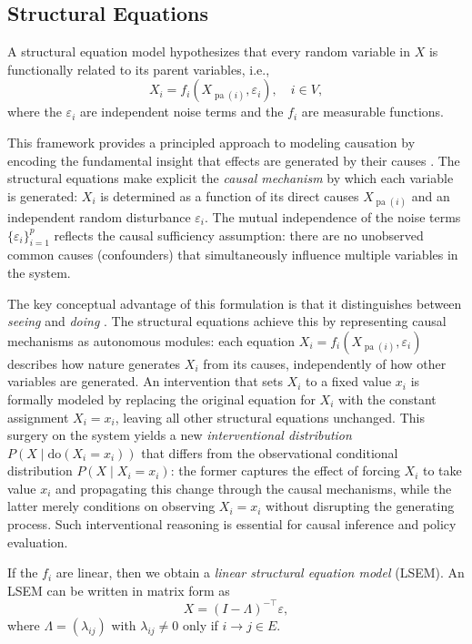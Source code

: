 \documentclass[11pt,a4paper]{article}
\numberwithin{equation}{section}
\DeclareMathOperator{\pa}{pa}
\begin{document}

\subsection{Structural Equations}
\label{subsec:equations}

A structural equation model hypothesizes that every random variable in $X$ is functionally related to its parent variables, i.e.,
\[
X_i = f_i(X_{\pa(i)}, \varepsilon_i), \quad i \in V,
\]
where the $\varepsilon_i$ are independent noise terms and the $f_i$ are measurable functions.

This framework provides a principled approach to modeling causation by encoding the fundamental insight that effects are generated by their causes \citep{Peters:Elements:2017}. The structural equations make explicit the \emph{causal mechanism} by which each variable is generated: $X_i$ is determined as a function of its direct causes $X_{\pa(i)}$ and an independent random disturbance $\varepsilon_i$. The mutual independence of the noise terms $\{\varepsilon_i\}_{i=1}^p$ reflects the causal sufficiency assumption: there are no unobserved common causes (confounders) that simultaneously influence multiple variables in the system.

The key conceptual advantage of this formulation is that it distinguishes between \emph{seeing} and \emph{doing} \citep{pearl:causality:2009}. The structural equations achieve this by representing causal mechanisms as autonomous modules: each equation $X_i = f_i(X_{\pa(i)}, \varepsilon_i)$ describes how nature generates $X_i$ from its causes, independently of how other variables are generated. An intervention that sets $X_i$ to a fixed value $x_i$ is formally modeled by replacing the original equation for $X_i$ with the constant assignment $X_i = x_i$, leaving all other structural equations unchanged. This surgery on the system yields a new \emph{interventional distribution} $P(X \mid \mathrm{do}(X_i = x_i))$ that differs from the observational conditional distribution $P(X \mid X_i = x_i)$: the former captures the effect of forcing $X_i$ to take value $x_i$ and propagating this change through the causal mechanisms, while the latter merely conditions on observing $X_i = x_i$ without disrupting the generating process. Such interventional reasoning is essential for causal inference and policy evaluation.

If the $f_i$ are linear, then we obtain a \emph{linear structural equation model} (LSEM). An LSEM can be written in matrix form as
\begin{equation}
\label{eq:lsem}
X = (I - \Lambda)^{-\top} \varepsilon,
\end{equation}
where $\Lambda = (\lambda_{ij})$ with $\lambda_{ij} \neq 0$ only if $i \to j \in E$.
\end{document}
